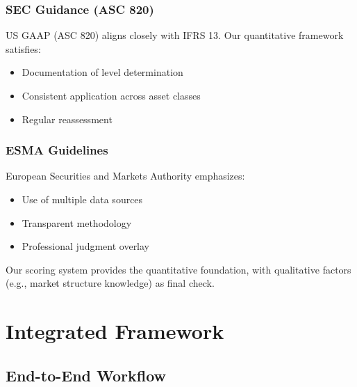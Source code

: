 \documentclass[11pt,a4paper]{article}
\begin{document}
\subsubsection{SEC Guidance (ASC 820)}

US GAAP (ASC 820) aligns closely with IFRS 13. Our quantitative framework satisfies:
\begin{itemize}
    \item Documentation of level determination
    \item Consistent application across asset classes
    \item Regular reassessment
\end{itemize}

\subsubsection{ESMA Guidelines}

European Securities and Markets Authority emphasizes:
\begin{itemize}
    \item Use of multiple data sources
    \item Transparent methodology
    \item Professional judgment overlay
\end{itemize}

Our scoring system provides the quantitative foundation, with qualitative factors (e.g., market structure knowledge) as final check.

\section{Integrated Framework}

\subsection{End-to-End Workflow}
\end{document}

